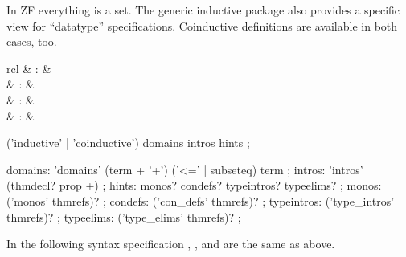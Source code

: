 \begin{isabellebody}
\begin{isamarkuptext}
\begin{description}
  \end{description}%
\end{isamarkuptext}%
\isamarkuptrue%
%
\isamarkuptrue%
%
\isamarkuptrue%
%
\begin{isamarkuptext}%
In ZF everything is a set.  The generic inductive package also
  provides a specific view for ``datatype'' specifications.
  Coinductive definitions are available in both cases, too.

  \begin{matharray}{rcl}
    \hypertarget{command.ZF.inductive}{\hyperlink{command.ZF.inductive}{\mbox{}}} & : &  \\
    \hypertarget{command.ZF.coinductive}{\hyperlink{command.ZF.coinductive}{\mbox{}}} & : &  \\
    \hypertarget{command.ZF.datatype}{\hyperlink{command.ZF.datatype}{\mbox{}}} & : &  \\
    \hypertarget{command.ZF.codatatype}{\hyperlink{command.ZF.codatatype}{\mbox{}}} & : &  \\
  \end{matharray}

  \begin{rail}
    ('inductive' | 'coinductive') domains intros hints
    ;

    domains: 'domains' (term + '+') ('<=' | subseteq) term
    ;
    intros: 'intros' (thmdecl? prop +)
    ;
    hints: monos? condefs? typeintros? typeelims?
    ;
    monos: ('monos' thmrefs)?
    ;
    condefs: ('con\_defs' thmrefs)?
    ;
    typeintros: ('type\_intros' thmrefs)?
    ;
    typeelims: ('type\_elims' thmrefs)?
    ;
  \end{rail}

  In the following syntax specification , , and  are the same as above.


\end{isamarkuptext}
\end{isabellebody}
